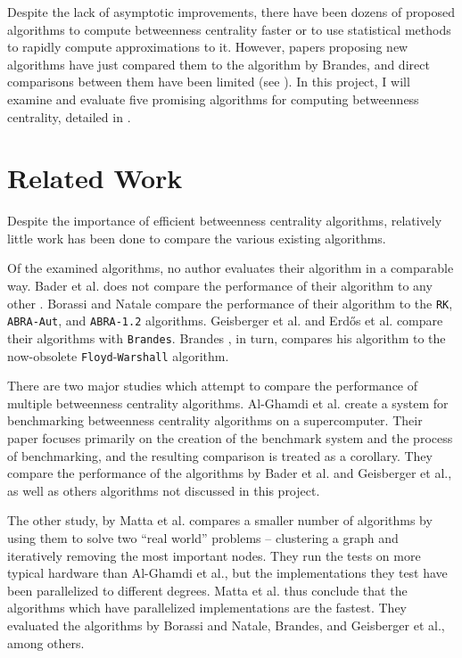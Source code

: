 \documentclass[12pt,a4paper,twoside,openright]{report}
\newcommand{\ttt}[1]{\texttt{#1}}
\newcommand{\erdos}{Erd\H{o}s }
\begin{document}
	Despite the lack of asymptotic improvements, there have been dozens of proposed algorithms to compute betweenness centrality faster or to use statistical methods to rapidly compute approximations to it. However, papers proposing new algorithms have just compared them to the algorithm by Brandes, and direct comparisons between them have been limited (see \textit{}). In this project, I will examine and evaluate five promising algorithms for computing betweenness centrality, detailed in \textit{}.
	
	\section{Related Work}\label{sec:related_work}
	
	Despite the importance of efficient betweenness centrality algorithms, relatively little work has been done to compare the various existing algorithms.
	
	Of the examined algorithms, no author evaluates their algorithm in a comparable way. Bader et al. does not compare the performance of their algorithm to any other \cite{bader}. Borassi and Natale \cite{borassi} compare the performance of their algorithm to the \ttt{RK}, \ttt{ABRA-Aut}, and \ttt{ABRA-1.2} algorithms. Geisberger et al. \cite{geisberger} and \erdos et al. \cite{erdos} compare their algorithms with \ttt{Brandes}. Brandes \cite{brandes}, in turn, compares his algorithm to the now-obsolete \ttt{Floyd}-\ttt{Warshall} algorithm.
	
	There are two major studies which attempt to compare the performance of multiple betweenness centrality algorithms. Al-Ghamdi et al. \cite{comparebig} create a system for benchmarking betweenness centrality algorithms on a supercomputer. Their paper focuses primarily on the creation of the benchmark system and the process of benchmarking, and the resulting comparison is treated as a corollary. They compare the performance of the algorithms by Bader et al. and Geisberger et al., as well as others algorithms not discussed in this project.
	
	The other study, by Matta et al. \cite{comparesmall} compares a smaller number of algorithms by using them to solve two ``real world'' problems -- clustering a graph and iteratively removing the most important nodes. They run the tests on more typical hardware than Al-Ghamdi et al., but the implementations they test have been parallelized to different degrees. Matta et al. thus conclude that the algorithms which have parallelized implementations are the fastest. They evaluated the algorithms by Borassi and Natale, Brandes, and Geisberger et al., among others.
\end{document}
